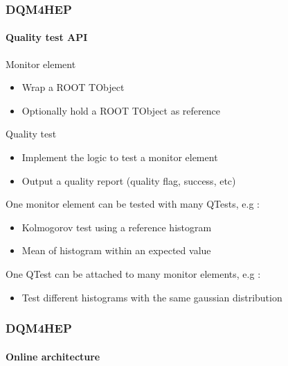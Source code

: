 \documentclass[presentation, 10pt]{beamer}
\begin{document}
\begin{frame}
  \frametitle{DQM4HEP}
  \framesubtitle{Quality test API}
  \footnotesize
  \begin{block}{Monitor element}
    \begin{itemize}
      \item Wrap a ROOT TObject
      \item Optionally hold a ROOT TObject as reference
    \end{itemize}
  \end{block}
  \begin{block}{Quality test}
    \begin{itemize}
      \item Implement the logic to test a monitor element
      \item Output a quality report (quality flag, success, etc)
    \end{itemize}
  \end{block}
  One monitor element can be tested with many QTests, e.g : \\
  \begin{itemize}
    \item Kolmogorov test using a reference histogram
    \item Mean of histogram within an expected value
  \end{itemize}
  One QTest can be attached to many monitor elements, e.g :
  \begin{itemize}
    \item Test different histograms with the same gaussian distribution
  \end{itemize}
\end{frame}


\begin{frame}
  \frametitle{DQM4HEP}
  \framesubtitle{Online architecture}
\end{frame}
\end{document}
